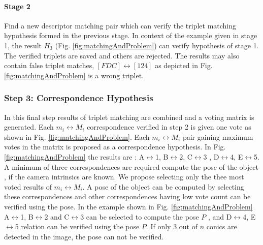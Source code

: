\documentclass{bmvc2k}
\begin{document}
\paragraph{Stage 2} Find a new descriptor matching pair which can verify the triplet matching hypothesis formed in the previous stage. In context of the example given in stage 1, the result $ H_3 $ (Fig. \ref{fig:matchingAndProblem}) can verify hypothesis of stage 1.  
%
The verified triplets are saved and others are rejected. 
The results may also contain false triplet matches, $ [F D C]\leftrightarrow [1 2 4]$ as depicted in Fig.\ref{fig:matchingAndProblem} is a wrong triplet. 

\subsubsection{Step 3: Correspondence Hypothesis }
\label{subSec:CHypo}
In this final step results of triplet matching are combined and a voting matrix is generated. Each $ m_i \leftrightarrow M_i $ correspondence verified in step 2 is given one vote as shown in Fig. \ref{fig:matchingAndProblem}. 
Each $ m_i \leftrightarrow M_i $ pair gaining maximum votes in the matrix is proposed as a correspondence hypothesis.
In Fig. \ref{fig:matchingAndProblem} the results are : A$ \leftrightarrow $1, B$ \leftrightarrow $2, C$ \leftrightarrow $3 , D$ \leftrightarrow $4, E$ \leftrightarrow $5. 
A minimum of three correspondences are required compute the pose of the object \cite{lepetit_monocular_2005}, if the camera intrinsics are known. 
We propose selecting only the thee most voted results of $ m_i \leftrightarrow M_i $.  
A pose of the object can be computed by selecting these correspondences and other correspondences having low vote count can be verified using the pose.  
In the example shown in Fig. \ref{fig:matchingAndProblem} A$ \leftrightarrow $1, B$ \leftrightarrow $2 and C$ \leftrightarrow $3 can be selected to compute the pose $ P $ , and D$ \leftrightarrow $4, E$ \leftrightarrow $5 relation can be verified using the pose $ P $.
If only 3 out of $ n $ conics are detected in the image, the pose can not be verified. 
\end{document}
